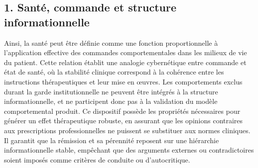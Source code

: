 \documentclass[12pt,letterpaper,oneside]{article}
\begin{document}
\subsection*{1. Santé, commande et structure informationnelle}
Ainsi, la santé peut être définie comme une fonction proportionnelle à l’application effective des commandes comportementales dans les milieux de vie du patient. Cette relation établit une analogie cybernétique entre commande et état de santé, où la stabilité clinique correspond à la cohérence entre les instructions thérapeutiques et leur mise en œuvres. Les comportements exclus durant la garde institutionnelle ne peuvent être intégrés à la structure informationnelle, et ne participent donc pas à la validation du modèle comportemental produit.
Ce dispositif possède les propriétés nécessaires pour générer un effet thérapeutique robuste, en assurant que les opinions contraires aux prescriptions professionnelles ne puissent se substituer aux normes cliniques. Il garantit que la rémission et sa pérennité reposent sur une hiérarchie informationnelle stable, empêchant que des arguments externes ou contradictoires soient imposés comme critères de conduite ou d’autocritique.
\end{document}
